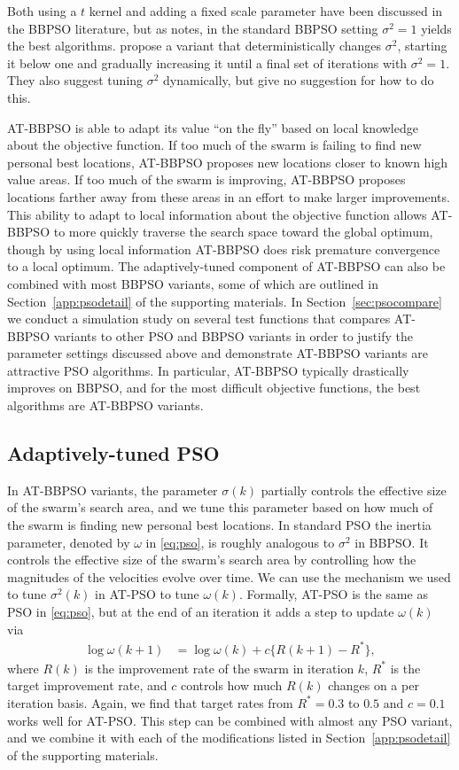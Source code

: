 \documentclass[cmbright]{staauth}
\begin{document}
Both using a $t$ kernel and adding a fixed scale parameter have been discussed in the BBPSO literature, but as \cite{kennedy2003bare} notes, in the standard BBPSO setting $\sigma^2=1$ yields the best algorithms. \cite{hsieh2010modified} propose a variant that deterministically changes $\sigma^2$, starting it below one and gradually increasing it until a final set of iterations with $\sigma^2=1$. They also suggest tuning $\sigma^2$ dynamically, but give no suggestion for how to do this.

AT-BBPSO is able to adapt its value ``on the fly'' based on local knowledge about the objective function. If too much of the swarm is failing to find new personal best locations, AT-BBPSO proposes new locations closer to known high value areas. If too much of the swarm is improving, AT-BBPSO proposes locations farther away from these areas in an effort to make larger improvements. This ability to adapt to local information about the objective function allows AT-BBPSO to more quickly traverse the search space toward the global optimum, though by using local information AT-BBPSO does risk premature convergence to a local optimum. The adaptively-tuned component of AT-BBPSO can also be combined with most BBPSO variants, some of which are outlined in Section~\ref{app:psodetail} of the supporting materials. In Section~\ref{sec:psocompare} we conduct a simulation study on several test functions that compares AT-BBPSO variants to other PSO and BBPSO variants in order to justify the parameter settings discussed above and demonstrate AT-BBPSO variants are attractive PSO algorithms. In particular, AT-BBPSO typically drastically improves on BBPSO, and for the most difficult objective functions, the best algorithms are AT-BBPSO variants.

\subsection{Adaptively-tuned PSO}\label{sec:AT-PSO}
In AT-BBPSO variants, the parameter $\sigma(k)$ partially controls the effective size of the swarm's search area, and we tune this parameter based on how much of the swarm is finding new personal best locations. In standard PSO the inertia parameter, denoted by $\omega$ in \eqref{eq:pso}, is roughly analogous to $\sigma^2$ in BBPSO. It controls the effective size of the swarm's search area by controlling how the magnitudes of the velocities evolve over time. We can use the mechanism we used to tune $\sigma^2(k)$ in AT-PSO to tune $\omega(k)$. Formally, AT-PSO is the same as PSO in \eqref{eq:pso}, but at the end of an iteration it adds a step to update $\omega(k)$ via
\begin{align}\label{eq:atpso}
\log\omega(k+1)& = \log\omega(k) + c \{R(k+1) - R^*\},
\end{align}
where $R(k)$ is the improvement rate of the swarm in iteration $k$, $R^*$ is the target improvement rate, and $c$ controls how much $R(k)$ changes on a per iteration basis. Again, we find that target rates from $R^*=0.3$ to $0.5$ and $c=0.1$ works well for AT-PSO.  This step can be combined with almost any PSO variant, and we combine it with each of the modifications listed in Section~\ref{app:psodetail} of the supporting materials.
\end{document}
